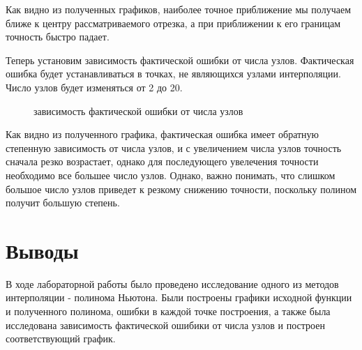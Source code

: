 \documentclass{article}
\begin{document}
Как видно из полученных графиков, наиболее точное приближение мы получаем ближе к центру рассматриваемого отрезка, а при приближении к его границам точность быстро падает.

\bigskip

Теперь установим зависимость фактической ошибки от числа узлов. Фактическая ошибка будет устанавливаться в точках, не являющихся узлами интерполяции. Число узлов будет изменяться от 2 до 20.

\begin{figure}[H]
\centering
\caption{зависимость фактической ошибки от числа узлов}
\end{figure}

Как видно из полученного графика, фактическая ошибка имеет обратную степенную зависимость от числа узлов, и с увеличением числа узлов точность сначала резко возрастает, однако для последующего увелечения точности необходимо все большее число узлов. Однако, важно понимать, что слишком большое число узлов приведет к резкому снижению точности, поскольку полином получит большую степень.

\section{Выводы}

В ходе лабораторной работы было проведено исследование одного из методов интерполяции - полинома Ньютона. Были построены графики исходной функции и полученного полинома, ошибки в каждой точке построения, а также была исследована зависимость фактической ошибики от числа узлов и построен соответствующий график.
\end{document}
